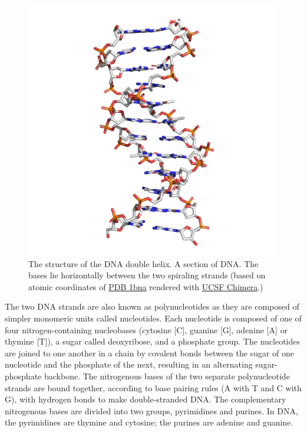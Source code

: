 \begin{figure}

{\centering \includegraphics[width=0.7\linewidth]{./figures/dna/dna_licorice} 

}

\caption{The structure of the DNA double helix. A section of DNA. The bases lie horizontally between the two spiraling strands (based on atomic coordinates of \href{https://www.rcsb.org/structure/1bna}{PDB 1bna} rendered with \href{https://www.cgl.ucsf.edu/chimera/}{UCSF Chimera}.)}\label{fig:dnastruc}
\end{figure}

The two DNA strands are also known as polynucleotides as they are composed of simpler monomeric units called nucleotides. Each nucleotide is composed of one of four nitrogen-containing nucleobases (cytosine {[}C{]}, guanine {[}G{]}, adenine {[}A{]} or thymine {[}T{]}), a sugar called deoxyribose, and a phosphate group. The nucleotides are joined to one another in a chain by covalent bonds between the sugar of one nucleotide and the phosphate of the next, resulting in an alternating sugar-phosphate backbone. The nitrogenous bases of the two separate polynucleotide strands are bound together, according to base pairing rules (A with T and C with G), with hydrogen bonds to make double-stranded DNA. The complementary nitrogenous bases are divided into two groups, pyrimidines and purines. In DNA, the pyrimidines are thymine and cytosine; the purines are adenine and guanine.



